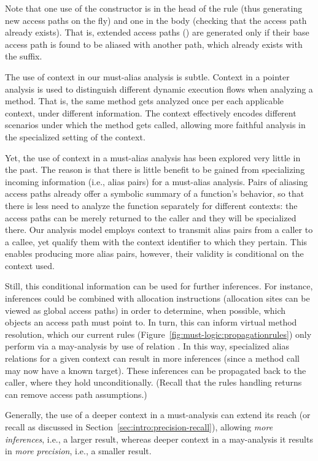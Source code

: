 Note that one use of the constructor  is in the head of the rule (thus generating new access paths on the fly) and one in the body (checking that the access path already exists). That is, extended access paths () are generated only if their base access path is found to be aliased with another path, which already exists with the  suffix.


The use of context in our must-alias analysis is subtle. Context in a pointer analysis is used to distinguish different dynamic execution flows when analyzing a method. That is, the same method gets analyzed once per each applicable context, under different information. The context effectively encodes different scenarios under which the method gets called, allowing more faithful analysis in the specialized setting of the context.

Yet, the use of context in a must-alias analysis has been explored very little in the past. The reason is that there is little benefit to be gained from specializing incoming information (i.e., alias pairs) for a must-alias analysis. Pairs of aliasing access paths already offer a symbolic summary of a function's behavior, so that there is less need to analyze the function separately for different contexts: the access paths can be merely returned to the caller and they will be specialized there. Our analysis model employs context to transmit alias pairs from a caller to a callee, yet qualify them with the context identifier to which they pertain. This enables producing more alias pairs, however, their validity is conditional on the context used.

Still, this conditional information can be used for further inferences. For instance,  inferences could be combined with allocation instructions (allocation sites can be viewed as global access paths) in order to determine, when possible, which objects an access path must point to. In turn, this can inform virtual method resolution, which our current rules (Figure~\ref{fig:must-logic:propagationrules}) only perform via a may-analysis by use of relation . In this way, specialized alias relations for a given context can result in more inferences (since a method call may now have a known target). These inferences can be propagated back to the caller, where they hold unconditionally. (Recall that the rules handling returns can remove access path assumptions.)

Generally, the use of a deeper context in a must-analysis can extend its reach (or recall as discussed in Section~\ref{sec:intro:precision-recall}), allowing \emph{more inferences}, i.e., a larger result, whereas deeper context in a may-analysis it results in \emph{more precision}, i.e., a smaller result. 


